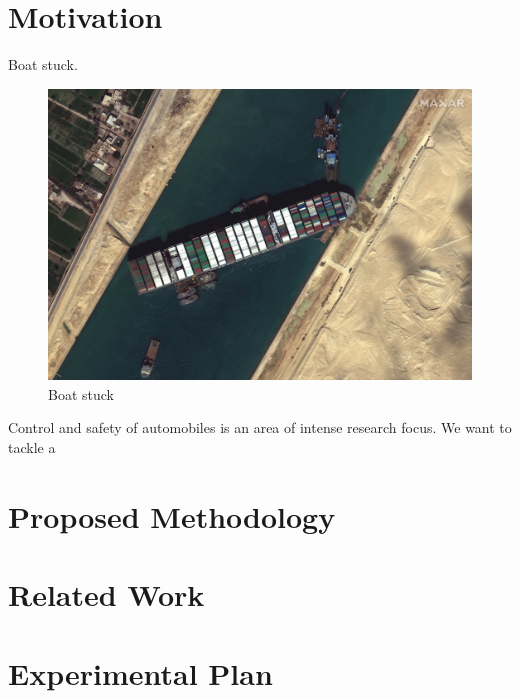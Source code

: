 \documentclass[journal]{IEEEtran}
\begin{document}
\section{Motivation}
Boat stuck.
\begin{figure}
    \centering
    \includegraphics{documents/proposal/Suez_Canal_blocked_by_Ever_Given_March_27_2021.jpg}
    \caption{Boat stuck\label{fig:boat_stuck}}
\end{figure}
Control and safety of automobiles is an area of intense research focus. We want to tackle a 
\section{Proposed Methodology}

\section{Related Work}

\section{Experimental Plan}




\end{document}
